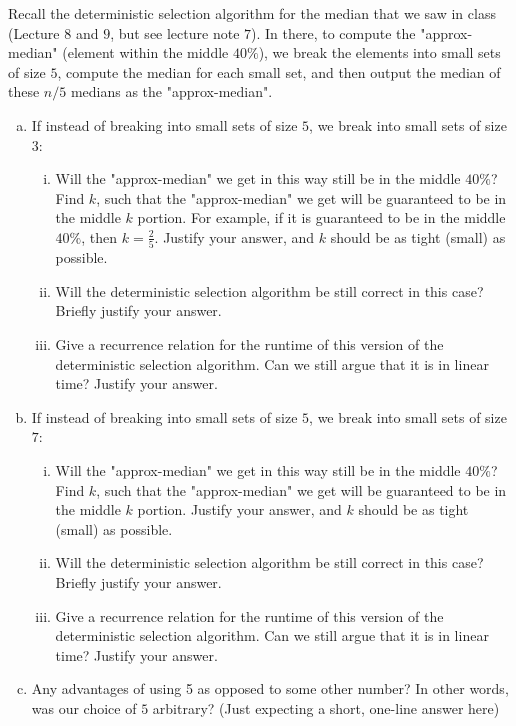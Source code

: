 \documentclass[11pt]{article}
\begin{document}
    \begin{tcolorbox}[title={Problem 1 (Selection Algorithm, 35 pts)}] \setlength\parindent{1em}
        Recall the deterministic selection algorithm for the median that we saw in class (Lecture $8$ and $9$, but see lecture note $7$). In there, to compute the "approx-median" (element within the middle $40\%$), we break the elements into small sets of size $5$, compute the median for each small set, and then output the median of these $n/5$ medians as the "approx-median".
        \begin{enumerate}[(a)]
           \item If instead of breaking into small sets of size $5$, we break into small sets of size $3$:
           \begin{enumerate}[i.]
               \item Will the "approx-median" we get in this way still be in the middle $40\%$? Find $k$, such that the "approx-median" we get will be guaranteed to be in the middle $k$ portion. For example, if it is guaranteed to be in the middle $40\%$, then $k=\frac{2}{5}$. Justify your answer, and $k$ should be as tight (small) as possible.
               \item Will the deterministic selection algorithm be still correct in this case? Briefly justify your answer.
               \item Give a recurrence relation for the runtime of this version of the deterministic selection algorithm. Can we still argue that it is in linear time? Justify your answer.
           \end{enumerate}
           \item If instead of breaking into small sets of size $5$, we break into small sets of size $7$:
           \begin{enumerate}[i.]
               \item Will the "approx-median" we get in this way still be in the middle $40\%$? Find $k$, such that the "approx-median" we get will be guaranteed to be in the middle $k$ portion. Justify your answer, and $k$ should be as tight (small) as possible.
               \item Will the deterministic selection algorithm be still correct in this case? Briefly justify your answer.
               \item Give a recurrence relation for the runtime of this version of the deterministic selection algorithm. Can we still argue that it is in linear time? Justify your answer.
           \end{enumerate}
           \item Any advantages of using 5 as opposed to some other number? In other words, was our choice of $5$ arbitrary? (Just expecting a short, one-line answer here)
       \end{enumerate}
    \end{tcolorbox}
\end{document}
